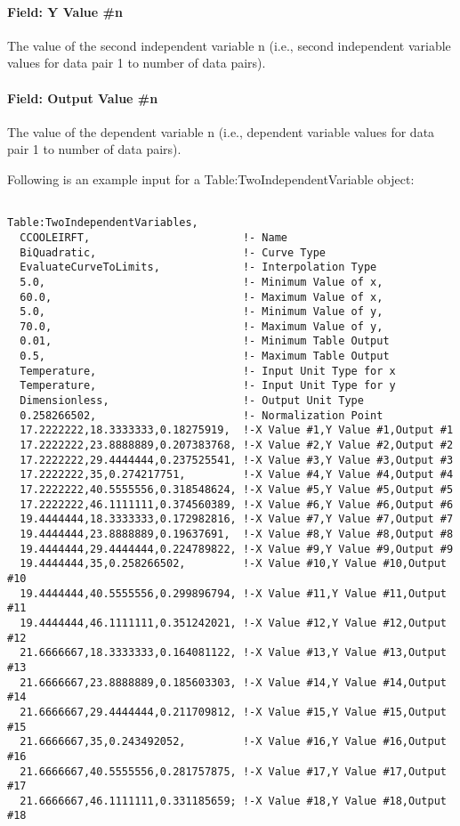 \paragraph{Field: Y Value \#n}\label{field-y-value-n}

The value of the second independent variable n (i.e., second independent variable values for data pair 1 to number of data pairs).

\paragraph{Field: Output Value \#n}\label{field-output-value-n-1}

The value of the dependent variable n (i.e., dependent variable values for data pair 1 to number of data pairs).

Following is an example input for a Table:TwoIndependentVariable object:

\begin{lstlisting}

Table:TwoIndependentVariables,
  CCOOLEIRFT,                        !- Name
  BiQuadratic,                       !- Curve Type
  EvaluateCurveToLimits,             !- Interpolation Type
  5.0,                               !- Minimum Value of x,
  60.0,                              !- Maximum Value of x,
  5.0,                               !- Minimum Value of y,
  70.0,                              !- Maximum Value of y,
  0.01,                              !- Minimum Table Output
  0.5,                               !- Maximum Table Output
  Temperature,                       !- Input Unit Type for x
  Temperature,                       !- Input Unit Type for y
  Dimensionless,                     !- Output Unit Type
  0.258266502,                       !- Normalization Point
  17.2222222,18.3333333,0.18275919,  !-X Value #1,Y Value #1,Output #1
  17.2222222,23.8888889,0.207383768, !-X Value #2,Y Value #2,Output #2
  17.2222222,29.4444444,0.237525541, !-X Value #3,Y Value #3,Output #3
  17.2222222,35,0.274217751,         !-X Value #4,Y Value #4,Output #4
  17.2222222,40.5555556,0.318548624, !-X Value #5,Y Value #5,Output #5
  17.2222222,46.1111111,0.374560389, !-X Value #6,Y Value #6,Output #6
  19.4444444,18.3333333,0.172982816, !-X Value #7,Y Value #7,Output #7
  19.4444444,23.8888889,0.19637691,  !-X Value #8,Y Value #8,Output #8
  19.4444444,29.4444444,0.224789822, !-X Value #9,Y Value #9,Output #9
  19.4444444,35,0.258266502,         !-X Value #10,Y Value #10,Output #10
  19.4444444,40.5555556,0.299896794, !-X Value #11,Y Value #11,Output #11
  19.4444444,46.1111111,0.351242021, !-X Value #12,Y Value #12,Output #12
  21.6666667,18.3333333,0.164081122, !-X Value #13,Y Value #13,Output #13
  21.6666667,23.8888889,0.185603303, !-X Value #14,Y Value #14,Output #14
  21.6666667,29.4444444,0.211709812, !-X Value #15,Y Value #15,Output #15
  21.6666667,35,0.243492052,         !-X Value #16,Y Value #16,Output #16
  21.6666667,40.5555556,0.281757875, !-X Value #17,Y Value #17,Output #17
  21.6666667,46.1111111,0.331185659; !-X Value #18,Y Value #18,Output #18
\end{lstlisting}

